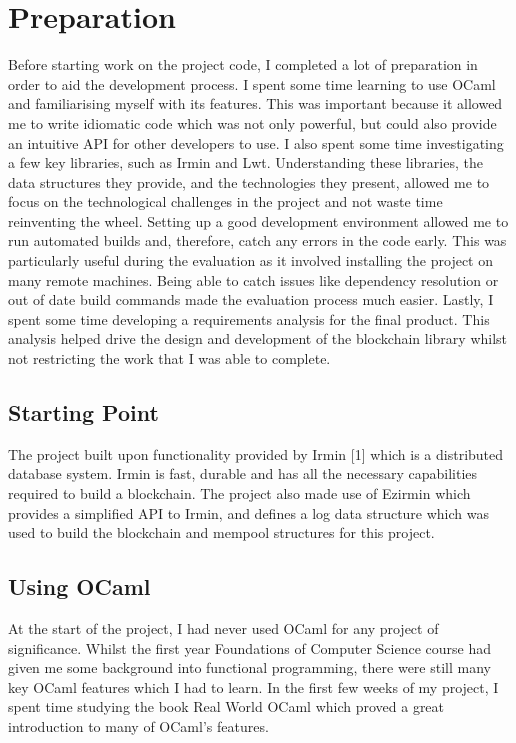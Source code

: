 \documentclass[12pt,a4paper,twoside,openright]{report}
\begin{document}
	\chapter{Preparation}
	Before starting work on the project code, I completed a lot of preparation in order to aid the development process.
	I spent some time learning to use OCaml and familiarising myself with its features.
	This was important because it allowed me to write idiomatic code which was not only powerful, but could also provide an intuitive API for other developers to use.
	I also spent some time investigating a few key libraries, such as Irmin and Lwt.
	Understanding these libraries, the data structures they provide, and the technologies they present, allowed me to focus on the technological challenges in the project and not waste time reinventing the wheel. 
	Setting up a good development environment allowed me to run automated builds and, therefore, catch any errors in the code early.
	This was particularly useful during the evaluation as it involved installing the project on many remote machines.
	Being able to catch issues like dependency resolution or out of date build commands made the evaluation process much easier.
	Lastly, I spent some time developing a requirements analysis for the final product. 
	This analysis helped drive the design and development of the blockchain library whilst not restricting the work that I was able to complete.

	\section{Starting Point}
	The project built upon functionality provided by Irmin [1] which is a distributed database system.  Irmin is fast, durable and has all the necessary capabilities required to build a blockchain.
	The project also made use of Ezirmin \cite{Ezirmin} which provides a simplified API to Irmin, and defines a log data structure which was used to build the blockchain and mempool structures for this project.

	\section{Using OCaml}
	At the start of the project, I had never used OCaml for any project of significance. 
	Whilst the first year Foundations of Computer Science course had given me some background into functional programming, there were still many key OCaml features which I had to learn.
	In the first few weeks of my project, I spent time studying the book Real World OCaml \cite{RealWorldOCaml} which proved a great introduction to many of OCaml's features.  
\end{document}
